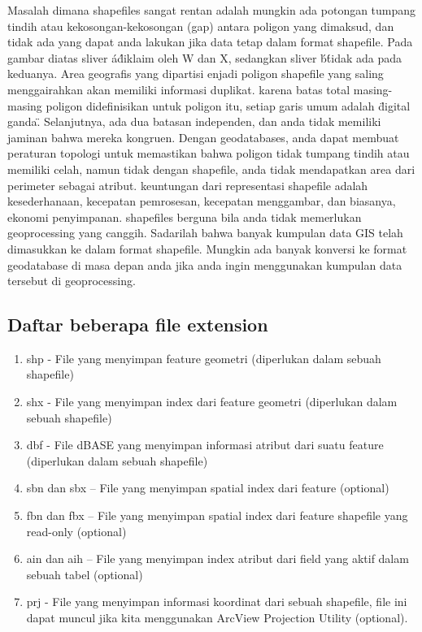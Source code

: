 Masalah dimana shapefiles sangat rentan adalah mungkin ada potongan tumpang tindih atau kekosongan-kekosongan (gap) antara poligon yang dimaksud, dan tidak ada yang dapat anda lakukan jika data tetap dalam format shapefile. Pada gambar diatas sliver \'a\' diklaim oleh W dan X, sedangkan sliver \'b\' tidak ada pada keduanya. Area geografis yang dipartisi enjadi poligon shapefile yang saling menggairahkan akan memiliki informasi duplikat. karena batas total masing-masing poligon didefinisikan untuk poligon itu, setiap garis umum adalah \"digital ganda\". Selanjutnya, ada dua batasan independen, dan anda tidak memiliki jaminan bahwa mereka kongruen. Dengan geodatabases, anda dapat membuat peraturan topologi untuk memastikan bahwa poligon tidak tumpang tindih atau memiliki celah, namun tidak dengan shapefile, anda tidak mendapatkan area dari perimeter sebagai atribut. keuntungan dari representasi shapefile adalah kesederhanaan, kecepatan pemrosesan, kecepatan menggambar, dan biasanya, ekonomi penyimpanan. shapefiles berguna bila anda tidak memerlukan geoprocessing yang canggih. Sadarilah bahwa banyak kumpulan data GIS telah dimasukkan ke dalam format shapefile. Mungkin ada banyak konversi ke format geodatabase di masa depan anda jika anda ingin menggunakan kumpulan data tersebut di geoprocessing.\cite{kennedy2013introducing}

\subsection{Daftar beberapa file extension}
\begin{enumerate}
    \item shp - File yang menyimpan feature geometri (diperlukan dalam sebuah shapefile) 
    \item shx - File yang menyimpan index dari feature geometri (diperlukan dalam sebuah shapefile) 
    \item dbf - File dBASE yang menyimpan informasi atribut dari suatu feature (diperlukan dalam sebuah shapefile) 
    \item sbn dan sbx – File yang menyimpan spatial index dari feature (optional) 
    \item fbn dan fbx – File yang menyimpan spatial index dari feature shapefile yang read-only (optional) 
    \item ain dan aih – File yang menyimpan index atribut dari field yang aktif dalam sebuah tabel (optional) 
    \item prj - File yang menyimpan informasi koordinat dari sebuah shapefile, file ini dapat muncul jika kita menggunakan ArcView Projection Utility (optional). \cite{surya2013sistem}
\end{enumerate} 
